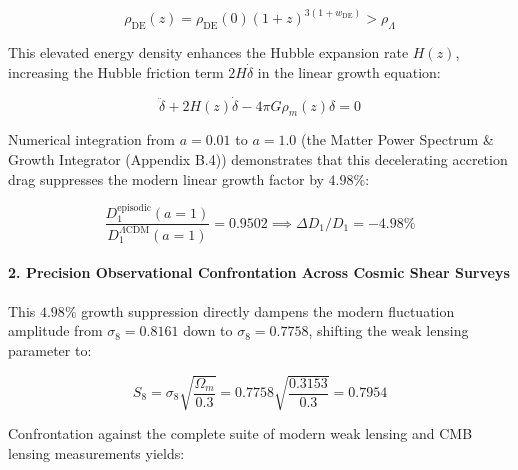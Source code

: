\documentclass[11pt,a4paper]{article}
\theoremstyle{definition}\newtheorem{definition}{Definition}
\theoremstyle{remark}\newtheorem{remark}{Remark}
\begin{document}
\begin{equation}
\rho_{\text{DE}}(z) = \rho_{\text{DE}}(0) (1+z)^{3(1+w_{\text{DE}})} > \rho_\Lambda
\end{equation}


This elevated energy density enhances the Hubble expansion rate $H(z)$, increasing the Hubble friction term $2H\dot{\delta}$ in the linear growth equation:


\begin{equation}
\ddot{\delta} + 2 H(z) \dot{\delta} - 4\pi G \rho_m(z) \delta = 0
\end{equation}


Numerical integration from $a = 0.01$ to $a = 1.0$ (the Matter Power Spectrum \& Growth Integrator (Appendix B.4)) demonstrates that this decelerating accretion drag suppresses the modern linear growth factor by \textbf{$4.98\%$}:


\begin{equation}
\frac{D_1^{\text{episodic}}(a=1)}{D_1^{\Lambda\text{CDM}}(a=1)} = 0.9502 \implies \Delta D_1 / D_1 = -4.98\%
\end{equation}

\paragraph{2. Precision Observational Confrontation Across Cosmic Shear Surveys}

This $4.98\%$ growth suppression directly dampens the modern fluctuation amplitude from $\sigma_8 = 0.8161$ down to $\sigma_8 = 0.7758$, shifting the weak lensing parameter to:


\begin{equation}
\boxed{S_8 = \sigma_8 \sqrt{\frac{\Omega_m}{0.3}} = 0.7758 \sqrt{\frac{0.3153}{0.3}} = 0.7954}
\end{equation}


Confrontation against the complete suite of modern weak lensing and CMB lensing measurements yields:
\end{document}
